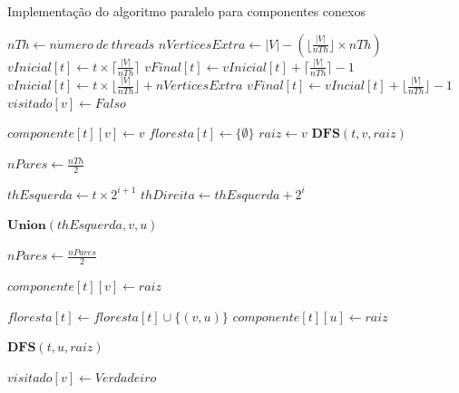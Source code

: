 \documentclass[12pt]{article}
\begin{document}
{\color{gray}\lipsum[1]}

\begin{algorithm}[h]
    \DontPrintSemicolon
    \caption{Implementação do algoritmo paralelo para componentes conexos}
    {
        $nTh \gets n\acute{u}mero\ de\ threads$\;
        $nVerticesExtra \gets |V| - (\lfloor \frac{|V|}{nTh} \rfloor \times nTh)$\;
        {
            {
                $vInicial[t] \gets t \times \lceil \frac{|V|}{nTh} \rceil$\;
                $vFinal[t] \gets vInicial[t] + \lceil \frac{|V|}{nTh} \rceil - 1$\;
            }
           {
                $vInicial[t] \gets t \times \lfloor \frac{|V|}{nTh} \rfloor + nVerticesExtra$\;
                $vFinal[t] \gets vIncial[t] + \lfloor \frac{|V|}{nTh} \rfloor - 1$\;
            }
        }
        {
            $visitado[v] \gets F\!also$\;
        }
        {
        
            {
                $componente[t][v] \gets v$\;
            }
            $floresta[t] \gets \{\emptyset\}$\;
            {
                {
                    $raiz \gets v$\;
                    $\textbf{DFS}(t,v,raiz)$\;
                }
            }
        }
        $nPares \gets \frac{nTh}{2}$\;
        {
            {
                $thEsquerda \gets t \times 2^{i+1}$\;
                $thDireita \gets thEsquerda + 2^i$\;
                
                {
                    $\textbf{Union}(thEsquerda,v,u)$\;
                }
            }
            $nPares \gets \frac{nPares}{2}$\;
        }
    }
    {
        $componente[t][v] \gets raiz$\;
        
        {
            $floresta[t] \gets floresta[t] \cup \{(v,u)\}$\;
            $componente[t][u] \gets raiz$\;
            
            {
                {
                    $\textbf{DFS}(t,u,raiz)$\;
                }
            }
        }
        $visitado[v] \gets V\!erdadeiro$\;
    }
\end{algorithm}
    
\end{document}
